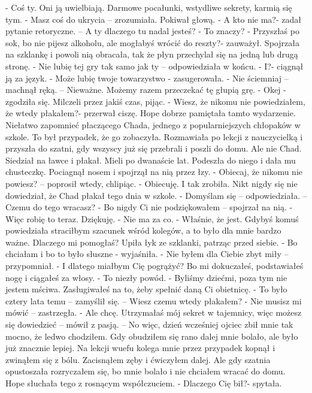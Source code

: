 \documentclass[12pt,a4paper]{book}
\begin{document}
- Coś ty. Oni ją uwielbiają. Darmowe pocałunki, wstydliwe sekrety, karmią się tym. 
- Masz coś do ukrycia – zrozumiała. 
Pokiwał głową. 
- A kto nie ma?- zadał pytanie retoryczne. – A ty dlaczego tu nadal jesteś?
- To znaczy?
- Przyszłaś po sok, bo nie pijesz alkoholu, ale mogłabyś wrócić do reszty?- zauważył.
Spojrzała na szklankę i powoli nią obracała, tak że płyn przechylał się na jedną lub drugą stronę.
- Nie lubię tej gry tak samo jak ty – odpowiedziała w końcu.
- I?- ciągnął ją za język.
- Może lubię twoje towarzystwo - zasugerowała.
- Nie ściemniaj – machnął ręką. – Nieważne. Możemy razem przeczekać tę głupią grę. 
- Okej - zgodziła się. 
Milczeli przez jakiś czas, pijąc. 
- Wiesz, że nikomu nie powiedziałem, że wtedy płakałem?- przerwał ciszę.
Hope dobrze pamiętała tamto wydarzenie. Niełatwo zapomnieć płaczącego Chada, jednego z popularniejszych chłopaków w szkole. To był przypadek, że go zobaczyła. Rozmawiała po lekcji z nauczycielką i przyszła do szatni, gdy wszyscy już się przebrali i poszli do domu. Ale nie Chad. Siedział na ławce i płakał. Mieli po dwanaście lat. Podeszła do niego i dała mu chusteczkę. Pociagnął nosem i spojrzął na nią przez łzy. 
- Obiecaj, że nikomu nie powiesz? – poprosił wtedy, chlipiąc.
- Obiecuję.
I tak zrobiła. Nikt nigdy się nie dowiedział, że Chad płakał tego dnia w szkole. 
- Domyślam się – odpowiedziała. – Czemu do tego wracasz?
- Bo nigdy Ci nie podziękowałem – spojrzał na nią. - Więc robię to teraz. Dziękuję.
- Nie ma za co. 
- Właśnie, że jest. Gdybyś komuś powiedziała straciłbym szacunek wśród kolegów, a to było dla mnie bardzo ważne. Dlaczego mi pomogłaś?
Upiła łyk ze szklanki, patrząc przed siebie. 
- Bo chciałam i bo to było słuszne - wyjaśniła.
- Nie byłem dla Ciebie zbyt miły – przypomniał. 
- I dlatego miałbym Cię pogrążyć? Bo mi dokuczałeś, podstawiałeś nogę i ciągałeś za włosy. 
- To niezły powód. 
- Byliśmy dziećmi, poza tym nie jestem mściwa. Zasługiwałeś na to, żeby spełnić daną Ci obietnicę.
- To było cztery lata temu – zamyślił się. – Wiesz czemu wtedy płakałem?
- Nie musisz mi mówić – zastrzegła.
- Ale chcę. Utrzymałaś mój sekret w tajemnicy, więc możesz się dowiedzieć –  mówił z pasją. – No więc, dzień wcześniej ojciec zbił mnie tak mocno, że ledwo chodziłem. Gdy obudziłem się rano dalej mnie bolało, ale było już znacznie lepiej. Na lekcji wuefu kolega mnie przez przypadek kopnął i zwinąłem się z bólu. Zacisnąłem zęby i ćwiczyłem dalej. Ale gdy szatnia opustoszała rozryczałem się, bo mnie bolało i nie chciałem wracać do domu. 
Hope słuchała tego z rosnącym współczuciem. 
- Dlaczego Cię bił?- spytała.
\end{document}
